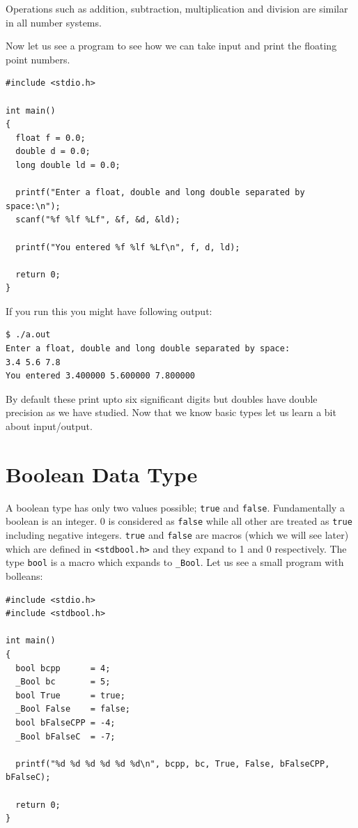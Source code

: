 Operations such as addition, subtraction, multiplication and division are
similar in all number systems.

Now let us see a program to see how we can take input and print the floating
point numbers.

\begin{Verbatim}[frame=single]
#include <stdio.h>

int main()
{
  float f = 0.0;
  double d = 0.0;
  long double ld = 0.0;

  printf("Enter a float, double and long double separated by space:\n");
  scanf("%f %lf %Lf", &f, &d, &ld);

  printf("You entered %f %lf %Lf\n", f, d, ld);

  return 0;
}
\end{Verbatim}

If you run this you might have following output:

\begin{Verbatim}[frame=single]
$ ./a.out
Enter a float, double and long double separated by space:
3.4 5.6 7.8
You entered 3.400000 5.600000 7.800000
\end{Verbatim}

By default these print upto six significant digits but doubles have double
precision as we have studied. Now that we know basic types let us learn a bit
about input/output.

\section{Boolean Data Type}
A boolean type has only two values possible; \texttt{true} and
\texttt{false}. Fundamentally a boolean is an integer. 0 is considered as
\texttt{false} while all other are treated as \texttt{true} including negative
integers. \texttt{true} and \texttt{false} are macros (which we will see later)
which are defined in \texttt{<stdbool.h>} and they expand to 1 and 0
respectively. The type \texttt{bool} is a macro which expands to
\texttt{\_Bool}. Let us see a small program with bolleans:

\begin{Verbatim}[frame=single]
#include <stdio.h>
#include <stdbool.h>

int main()
{
  bool bcpp      = 4;
  _Bool bc       = 5;
  bool True      = true;
  _Bool False    = false;
  bool bFalseCPP = -4;
  _Bool bFalseC  = -7;

  printf("%d %d %d %d %d %d\n", bcpp, bc, True, False, bFalseCPP, bFalseC);

  return 0;
}
\end{Verbatim}

